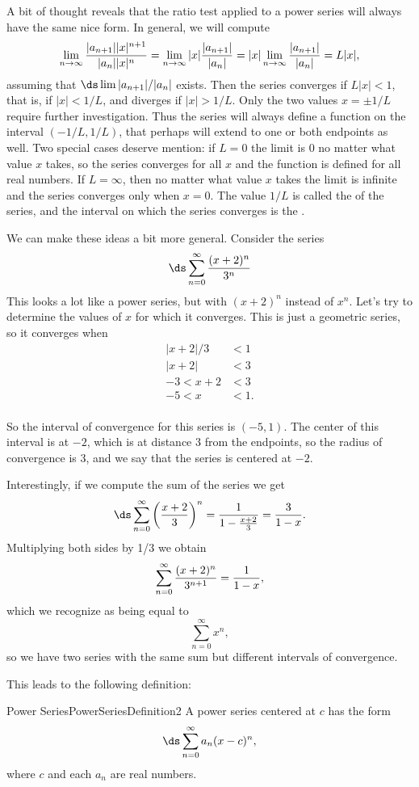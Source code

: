A bit of thought reveals that the ratio test applied to a power series
will always have the same nice form. In general, we will compute
\[
  \lim_{n\to\infty} {|a_{n+1}||x|^{n+1}\over |a_n||x|^n}
  =\lim_{n\to\infty} |x|{|a_{n+1}|\over |a_n|} =
  |x|\lim_{n\to\infty} {|a_{n+1}|\over |a_n|} =L|x|,
\]
assuming that $\ds \lim |a_{n+1}|/|a_n|$ exists. Then the series
converges if $L|x|<1$, that is, if $|x|<1/L$, and diverges if
$|x|>1/L$. Only the two values $x=\pm1/L$ require further
investigation. Thus the series will always define a function on
the interval $(-1/L,1/L)$, that perhaps will extend to one or both
endpoints as well. Two special cases deserve mention: if $L=0$ the
limit is $0$ no matter what value $x$ takes, so the series converges
for all $x$ and the function is defined for all real numbers. If
$L=\infty$, then no matter what value $x$ takes the limit is infinite
and the series converges only when $x=0$. The value $1/L$ is called
the  of the series, and the
interval on which the series converges is the .

We can  make these ideas a bit more general. Consider the series
\[\ds\sum_{n=0}^{\infty}\frac{(x+2)^n}{3^n}\]
This looks a lot like a power series, but with $(x+2)^n$ instead of $x^n$.
Let's try to determine the values of $x$ for which it converges.
This is just a geometric series, so it converges when
\begin{align*}
  |x+2|/3&<1	\\
  |x+2|&<3	\\
  -3 < x+2 &< 3	\\
  -5<x&<1.	\\
\end{align*}

So the interval of convergence for this series is $(-5,1)$. The center
of this interval is at $-2$, which is at distance 3 from the endpoints,
so the radius of convergence is 3, and we say that the series is centered at $-2$.

Interestingly, if we compute the sum of the series we get
\[\ds\sum_{n=0}^{\infty}\left(\frac{x+2}{3}\right)^n=\frac{1}{1-\frac{x+2}{3}}=\frac{3}{1-x}.\]
Multiplying both sides by 1/3 we obtain
\[\sum_{n=0}^\infty {(x+2)^n\over 3^{n+1}}={1\over 1-x},\]
which we recognize as being equal to
\[\sum_{n=0}^{\infty}x^n,\]
so we have two series with the same sum but different intervals of convergence.

This leads to the following definition:

\begin{definition}{Power Series}{PowerSeriesDefinition2}
A power series centered at $c$ has the form
$$\ds\sum_{n=0}^\infty a_n(x-c)^n,$$ 
where $c$ and each $a_n$ are real numbers.
\end{definition}

